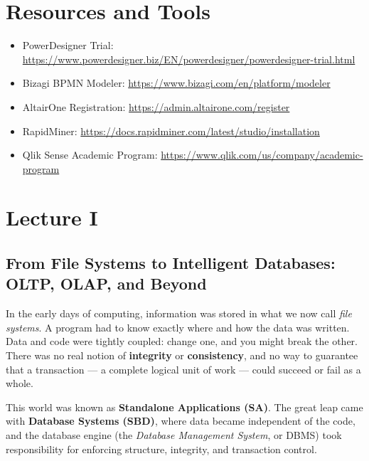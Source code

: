 \documentclass[12pt,a4paper]{article}
\begin{document}
\section*{Resources and Tools}
\begin{itemize}
    \item PowerDesigner Trial: \url{https://www.powerdesigner.biz/EN/powerdesigner/powerdesigner-trial.html}
    \item Bizagi BPMN Modeler: \url{https://www.bizagi.com/en/platform/modeler}
    \item AltairOne Registration: \url{https://admin.altairone.com/register}
    \item RapidMiner: \url{https://docs.rapidminer.com/latest/studio/installation}
    \item Qlik Sense Academic Program: \url{https://www.qlik.com/us/company/academic-program}
\end{itemize}

\section{Lecture I}
\subsection{From File Systems to Intelligent Databases: OLTP, OLAP, and Beyond}

In the early days of computing, information was stored in what we now call \emph{file systems}.  
A program had to know exactly where and how the data was written.  
Data and code were tightly coupled: change one, and you might break the other.  
There was no real notion of \textbf{integrity} or \textbf{consistency}, and no way to guarantee that a transaction --- a complete logical unit of work --- could succeed or fail as a whole.  

This world was known as \textbf{Standalone Applications (SA)}.  
The great leap came with \textbf{Database Systems (SBD)}, where data became independent of the code, and the database engine (the \emph{Database Management System}, or DBMS) took responsibility for enforcing structure, integrity, and transaction control.
\end{document}
